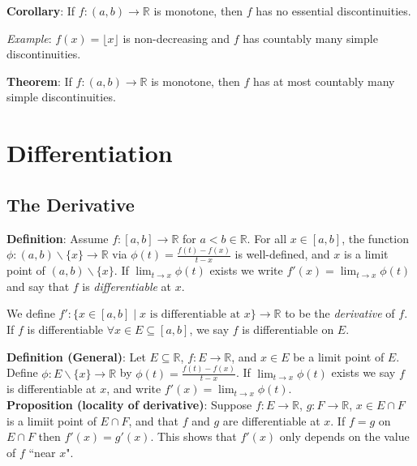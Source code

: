 \documentclass[11pt]{article}
\begin{document}
\textbf{Corollary}: If $f : (a,b) \to \mathbb{R}$ is monotone, then $f$ has no essential discontinuities.

\emph{Example}: $f(x) = \lfloor x \rfloor$ is non-decreasing and $f$ has countably many simple discontinuities.

\textbf{Theorem}: If $f : (a,b) \to \mathbb{R}$ is monotone, then $f$ has at most countably many simple discontinuities.


\section{Differentiation}

\subsection{The Derivative}

\textbf{Definition}: Assume $f : [a,b] \to \mathbb{R}$ for $a < b \in \mathbb{R}$. For all $x \in [a,b]$, the function $\phi : (a,b) \backslash \{x\} \to \mathbb{R}$ via $\phi(t) = \frac{f(t) - f(x)}{t - x}$ is well-defined, and $x$ is a limit point of $(a,b) \backslash \{x\}$. If $\lim_{t \to x} \phi(t)$ exists we write $f'(x) = \lim_{t \to x} \phi(t)$ and say that $f$ is \emph{differentiable} at $x$.

We define $f' : \{x \in [a,b] \mid x \text{ is differentiable at }x\} \to \mathbb{R}$ to be the \emph{derivative} of $f$. If $f$ is differentiable $\forall x \in E \subseteq [a,b]$, we say $f$ is differentiable on $E$.

\textbf{Definition (General)}: Let $E \subseteq \mathbb{R}$, $f : E \to \mathbb{R}$, and $x \in E$ be a limit point of $E$. Define $\phi : E \backslash \{x\} \to \mathbb{R}$ by $\phi(t) = \frac{f(t) - f(x)}{t-x}$. If $\lim_{t \to x} \phi(t)$ exists we say $f$ is differentiable at $x$, and write $f'(x) = \lim_{t \to x} \phi(t)$.\\

\textbf{Proposition (locality of derivative)}: Suppose $f : E \to \mathbb{R}$, $g : F \to \mathbb{R}$, $x \in E \cap F$ is a limiit point of $E \cap F$, and that $f$ and $g$ are differentiable at $x$. If $f = g$ on $E \cap F$ then $f'(x) = g'(x)$. This shows that $f'(x)$ only depends on the value of $f$ ``near $x$".
\end{document}
